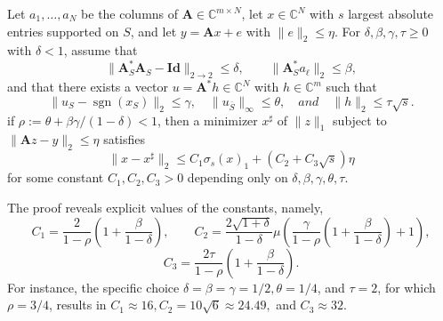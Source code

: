 \begin{theorem}
    \label{th0.4.33}
    Let $a_1,\dots,a_N$ be the columns of $\mathbf{A} \in \mathbb{C}^{m \times N}$, let $x \in \mathbb{C}^N$ with $s$ largest absolute entries supported on $S$, and let $y = \mathbf{A}x+e$ with $\|e\|_2 \leq \eta$. For $\delta,\beta,\gamma,\tau\geq 0$ with $\delta<1$, assume that
    \begin{equation}
        \|\mathbf{A}^*_S \mathbf{A}_S - \mathbf{Id}\|_{2 \rightarrow 2} \leq \delta, \qquad \|\mathbf{A}^*_S a_{\ell}\|_2 \leq \beta,
        \label{eq0.4.27}
    \end{equation}
    and that there exists a vector $u = \mathbf{A}^*h \in \mathbb{C}^N$ with $h \in \mathbb{C}^m$ such that
    \begin{equation}
        \|u_S - \mathop{\mathrm{sgn}}(x_S)\|_2 \leq \gamma, \quad \|u_{\overline{S}}\|_{\infty} \leq \theta, \quad and \quad \|h\|_2 \leq \tau\sqrt{s}.
        \label{eq0.4.28}
    \end{equation}
    if $\rho := \theta + \beta \gamma/(1-\delta)<1$, then a minimizer $x^{\sharp}$ of $\|z\|_1$ subject to $\|\mathbf{A}z - y\|_2 \leq \eta$ satisfies
    \[
        \|x - x^{\sharp}\|_2 \leq C_1 \sigma_s(x)_1 + (C_2 + C_3 \sqrt{s})\eta
    \]
    for some constant $C_1,C_2,C_3 > 0$ depending only on $\delta,\beta,\gamma,\theta,\tau$.
\end{theorem}

\begin{remark}
    \label{rmk0.4.34}
     The proof reveals explicit values of the constants, namely,
     \[
         C_1 = \frac{2}{1-\rho}\left( 1+\frac{\beta}{1-\delta} \right), \qquad C_2 = \frac{2\sqrt{1+\delta}}{1-\delta}\mu\left( \frac{\gamma}{1-\rho}\left( 1+\frac{\beta}{1-\delta} \right)+1 \right),
     \]
     \[
         C_3 = \frac{2\tau}{1-\rho}\left( 1+\frac{\beta}{1-\delta} \right).
     \]
     For instance, the specific choice $\delta = \beta = \gamma = 1/2, \theta = 1/4$, and $\tau = 2$, for which $\rho = 3/4$, results in $C_1 \approx 16, C_2 = 10\sqrt{6} \approx 24.49,$ and $C_3 \approx 32.$ 
\end{remark}

